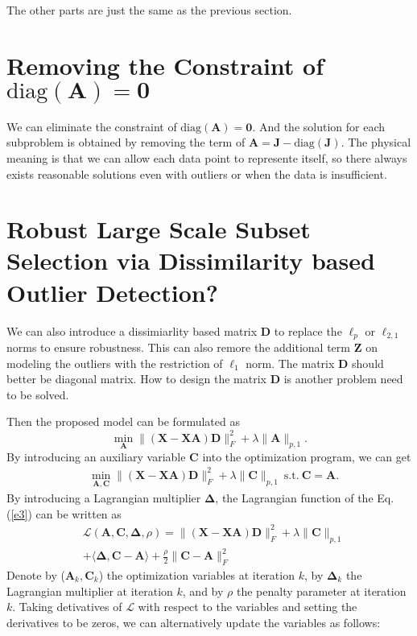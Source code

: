 \documentclass[10pt,twocolumn,letterpaper]{article}
\begin{document}
The other parts are just the same as the previous section.


\section{Removing the Constraint of $\text{diag}(\bm{A})=\bm{0}$}

We can eliminate the constraint of $\text{diag}(\bm{A})=\bm{0}$. And the solution for each subproblem is obtained by removing the term of $\bm{A}=\bm{J}-\text{diag}(\bm{J})$. The physical meaning is that we can allow each data point to represente itself, so there always exists reasonable solutions even with outliers or when the data is insufficient. 

\section{Robust Large Scale Subset Selection via Dissimilarity based Outlier Detection?}


We can also introduce a dissimiarlity based matrix $\bm{D}$ to replace the $\ell_{p}$ or $\ell_{2,1}$ norms to ensure robustness. This can also remore the additional term $\bm{Z}$ on modeling the outliers with the restriction of $\ell_{1}$ norm. The matrix $\bm{D}$ should better be diagonal matrix. How to design the matrix $\bm{D}$ is another problem need to be solved.

Then the proposed model can be formulated as  
\begin{equation}
\label{e2}
\min_{\bm{A}}
\|
(\bm{X}
-
\bm{X}\bm{A})
\bm{D}
\|_{F}^{2}
+
\lambda
\|
\bm{A}
\|_{p,1}
.
\end{equation}
By introducing an auxiliary variable $\bm{C}$ into the optimization program, we can get
\begin{equation}
\begin{split}
\label{e3}
&
\min_{\bm{A},\bm{C}}
\|
(\bm{X}
-
\bm{X}\bm{A})
\bm{D}
\|_{F}^{2}
+
\lambda
\|
\bm{C}
\|_{p,1}
\ 
\text{s.t.}
\ 
\bm{C}=\bm{A}
.
\end{split}
\end{equation}
By introducing a Lagrangian multiplier $\bm{\Delta}$, the Lagrangian function of the Eq. (\ref{e3}) can be written as
\begin{equation}
\begin{split}
\label{e5}
&
\mathcal{L}
(\bm{A},\bm{C},\bm{\Delta},\rho)
=
\|
(\bm{X}
-
\bm{X}\bm{A})
\bm{D}
\|_{F}^{2}
+
\lambda
\|
\bm{C}
\|_{p,1}
\\
&
+
\langle
\bm{\Delta},
\bm{C}-\bm{A}
\rangle
+
\frac{\rho}{2}
\|
\bm{C}
-
\bm{A}
\|_{F}^{2}
\end{split}
\end{equation}
Denote by ($\bm{A}_{k},\bm{C}_{k}$) the optimization variables at iteration $k$, by $\bm{\Delta}_{k}$ the Lagrangian multiplier at iteration $k$, and by $\rho$ the penalty parameter at iteration $k$. Taking detivatives of $\mathcal{L}$ with respect to the variables and setting the derivatives to be zeros, we can alternatively update the variables as follows:
\end{document}
